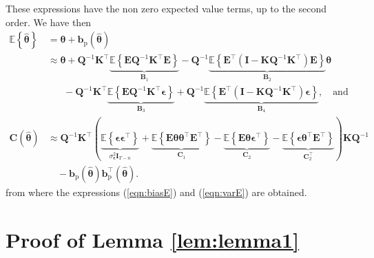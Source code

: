 These expressions have the non zero expected value terms, up to the second order. 
We have then
\begin{equation} \begin{aligned} \mathbb{E} \left\{ \widehat{\bm{\theta}} \right\} & = \bm{\theta} + \mathbf{b}_{\mathrm{p}} \left( \widehat{\bm{\theta}} \right) \\
& \approx \bm{\theta}  +  \mathbf{Q}^{-1} \mathbf{K}^\top \underbrace{\mathbb{E} \left\{ \mathbf{E} \mathbf{Q}^{-1} \mathbf{K}^\top \mathbf{E} \right\}}_{\mathbf{B}_1} - \mathbf{Q}^{-1} \underbrace{\mathbb{E} \left\{ \mathbf{E}^\top \left( \mathbf{I} - \mathbf{K} \mathbf{Q}^{-1} \mathbf{K}^\top \right) \mathbf{E} \right\}}_{\mathbf{B}_2} \bm{\theta} \\ 
& \quad \ \ \ - \mathbf{Q}^{-1} \mathbf{K}^\top \underbrace{\mathbb{E} \left\{ \mathbf{E} \mathbf{Q}^{-1} \mathbf{K}^\top \bm{\epsilon} \right\}}_{\mathbf{B}_3} + \mathbf{Q}^{-1} \underbrace{\mathbb{E} \left\{ \mathbf{E}^\top \left( \mathbf{I} - \mathbf{K} \mathbf{Q}^{-1} \mathbf{K}^\top \right) \bm{\epsilon} \right\}}_{\mathbf{B}_4} , \quad \text{and} \\ 
\mathbf{C} \left( \widehat{\bm{\theta}} \right)  & \approx \mathbf{Q}^{-1} \mathbf{K}^\top \left( \underbrace{\mathbb{E} \left\{ \bm{\epsilon} \bm{\epsilon}^\top \right\}}_{\sigma_{\bm{\epsilon}}^2 \mathbf{I}_{T-n}}  + \underbrace{\mathbb{E} \left\{ \mathbf{E} \bm{\theta} \bm{\theta}^\top \mathbf{E}^\top \right\}}_{\mathbf{C}_1}  - \underbrace{\mathbb{E} \left\{  \mathbf{E} \bm{\theta} \bm{\epsilon}^\top \right\}}_{\mathbf{C}_2} - \underbrace{\mathbb{E} \left\{ \bm{\epsilon} \bm{\theta}^\top \mathbf{E}^\top \right\}}_{\mathbf{C}_2^\top} \right) \mathbf{K} \mathbf{Q}^{-1} \\
& \quad - \mathbf{b}_{\mathrm{p}} \left( \widehat{\bm{\theta}} \right) \mathbf{b}_{\mathrm{p}}^\top \left( \widehat{\bm{\theta}} \right). \end{aligned} \end{equation} 
from where the expressions (\ref{eqn:biasE}) and (\ref{eqn:varE}) are obtained.



\section{Proof of Lemma \ref{lem:lemma1} \label{appendix:lemma1} } 

